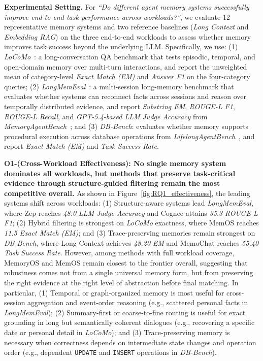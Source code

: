 \documentclass{llmxive}
\providecommand{\llm}{\textsc{LLM}\xspace}
\begin{document}
\noindent \textbf{Experimental Setting.}
For \textit{``Do different agent memory systems successfully improve end-to-end task performance across workloads?''}, we evaluate 12 representative memory systems and two reference baselines (\textit{Long Context} and \textit{Embedding RAG}) on the three end-to-end workloads to assess whether memory improves task success beyond the underlying \llm.
Specifically, we use: (1) \textit{LoCoMo}~\cite{maharana2024locomo}: a long-conversation QA benchmark that tests episodic, temporal, and open-domain memory over multi-turn interactions, and report the unweighted mean of category-level \textit{Exact Match (EM)} and \textit{Answer F1} on the four-category queries;
(2) \textit{LongMemEval}~\cite{wu2024longmemeval}: a multi-session long-memory benchmark that evaluates whether systems can reconnect facts across sessions and reason over temporally distributed evidence, and report \textit{Substring EM}, \textit{ROUGE-L F1}, \textit{ROUGE-L Recall}, and \textit{GPT-5.4-based \llm Judge Accuracy} from \textit{MemoryAgentBench}~\cite{memoryagentbench2026}; and (3) \textit{DB-Bench}: evaluates whether memory supports procedural execution across database operations from \textit{LifelongAgentBench}~\cite{DBLP:journals/corr/abs-2505-11942}, and report \textit{Exact Match (EM)} and \textit{Task Success Rate}.

\noindent \textbf{O1-(Cross-Workload Effectiveness): No single memory system dominates all workloads, but methods that preserve task-critical evidence through structure-guided filtering remain the most competitive overall.}
As shown in Figure~\ref{fig:RQ1_effectiveness}, the leading systems shift across workloads: (1) Structure-aware systems lead \textit{LongMemEval}, where Zep reaches \textit{48.0} \textit{\llm Judge Accuracy} and Cognee attains \textit{35.3} \textit{ROUGE-L F1}; 
(2) Hybrid filtering is strongest on \textit{LoCoMo} exactness, where MemOS reaches \textit{11.5} \textit{Exact Match (EM)}; and (3) Trace-preserving memories remain strongest on \textit{DB-Bench}, where Long Context achieves \textit{48.20} \textit{EM} and MemoChat reaches \textit{55.40} \textit{Task Success Rate}.
However, among methods with full workload coverage, MemoryOS and MemOS remain closest to the frontier overall, suggesting that robustness comes not from a single universal memory form, but from preserving the right evidence at the right level of abstraction before final matching.
In particular, (1) Temporal or graph-organized memory is most useful for cross-session aggregation and event-order reasoning (e.g., scattered personal facts in \textit{LongMemEval}); (2) Summary-first or coarse-to-fine routing is useful for exact grounding in long but semantically coherent dialogues (e.g., recovering a specific date or personal detail in \textit{LoCoMo}); and (3) Trace-preserving memory is necessary when correctness depends on intermediate state changes and operation order (e.g., dependent \texttt{UPDATE} and \texttt{INSERT} operations in \textit{DB-Bench}).
\end{document}
